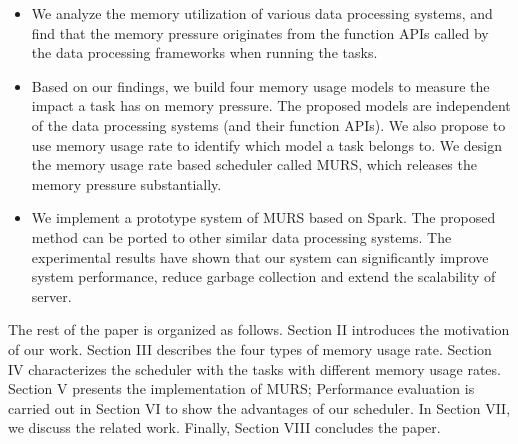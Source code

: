 \begin{itemize}

\item We analyze the memory utilization of various data processing systems, and find that the memory pressure originates from the function APIs called by the data processing frameworks when running the tasks. 

\item Based on our findings, we build four memory usage models to measure the impact a task has on memory pressure. The proposed models are independent of the data processing systems (and their function APIs). We also propose to use memory usage rate to identify which model a task belongs to. We design the memory usage rate based scheduler called MURS, which releases the memory pressure substantially.


\item We implement a prototype system of MURS based on Spark. The proposed method can be ported to other similar data processing systems. The experimental results have shown that our system can significantly improve system performance, reduce garbage collection and extend the scalability of server.

\end{itemize}

The rest of the paper is organized as follows. Section II introduces the motivation of our work. Section III describes the four types of memory usage rate. Section IV characterizes the scheduler with the tasks with different memory usage rates. Section V presents the implementation of MURS; Performance evaluation is carried out in Section VI to show the advantages of our scheduler. In Section VII, we discuss the related work. Finally, Section VIII concludes the paper.